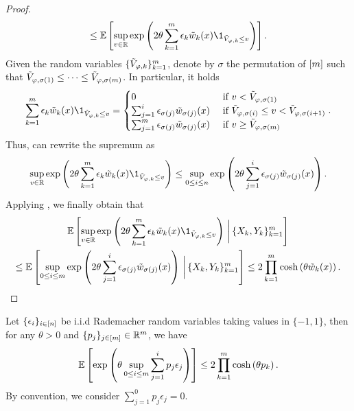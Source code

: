 \begin{proof}
\begin{equation*}
        \le \E\br{\sup_{v \in \R} \exp\pr{2 \theta \sum_{k=1}^{\ccount} \epsilon_{k} \tilde{w}_{k}(x) \1_{\tilde{V}_{\varphi,k} \le v}}}.
    \end{equation*}
    Given the random variables $\{\tilde{V}_{\varphi,k}\}_{k=1}^{m}$, denote by $\sigma$ the permutation of $[m]$ such that $\tilde{V}_{\varphi,\sigma(1)}\le\cdots\le \tilde{V}_{\varphi,\sigma(m)}$. In particular, it holds
    \begin{equation*}
        \sum_{k=1}^{\ccount} \epsilon_{k} \tilde{w}_{k}(x) \1_{\tilde{V}_{\varphi,k} \le v}
        = 
        \begin{cases}
            0 & \text { if } v < \tilde{V}_{\varphi,\sigma(1)} 
            \\ 
            \sum_{j=1}^i  \epsilon_{\sigma(j)} \tilde{w}_{\sigma(j)}(x) & \text { if } \tilde{V}_{\varphi,\sigma(i)} \le v < \tilde{V}_{\varphi,\sigma(i+1)}
            \\ 
            \sum_{j=1}^{\ccount} \epsilon_{\sigma(j)} \tilde{w}_{\sigma(j)}(x) & \text { if } v \ge \tilde{V}_{\varphi,\sigma(\ccount)}
        \end{cases}.
    \end{equation*}
    Thus, can rewrite the supremum as
    \begin{equation*}
        \sup_{v \in \R} \exp\pr{2 \theta \sum_{k=1}^{\ccount} \epsilon_{k} \tilde{w}_{k}(x) \1_{\tilde{V}_{\varphi,k} \le v}}
        \le \sup_{0 \le i \le n} \exp \pr{2 \theta \sum_{j=1}^i \epsilon_{\sigma(j)} \tilde{w}_{\sigma(j)}(x)}.
    \end{equation*}
    Applying , we finally obtain that
    \begin{multline*}
        \E\br{\sup_{v \in \R} \exp\pr{2 \theta \sum_{k=1}^{\ccount} \epsilon_{k} \tilde{w}_{k}(x) \1_{\tilde{V}_{\varphi,k} \le v}} \,\bigg\vert\, \acn{X_{k}, Y_{k}}_{k=1}^{\ccount}} 
        \\
        \le \E\br{\sup_{0 \le i \le \ccount} \exp \pr{2 \theta \sum_{j=1}^i \epsilon_{\sigma(j)} \tilde{w}_{\sigma(j)}(x)} \,\bigg\vert\, \acn{X_{k}, Y_{k}}_{k=1}^{\ccount}}
        \le 2 \prod_{k=1}^{\ccount} \cosh\pr{\theta \tilde{w}_{k}(x)}.
    \end{multline*}
  \end{proof}

  \begin{lemma}\label{lem:bound:weighted-rademacher}
    Let $\{{\epsilon_{i}}\}_{i\in[n]}$ be i.i.d Rademacher random variables taking values in $\{-1,1\}$, then for any $\theta>0$ and $\{p_{j}\}_{j\in[m]}\in\mathbb{R}^{m}$, we have
    \[
        \mathbb{E}\left[{\exp \left({\theta \sup_{0\le i \le m} \sum_{j=1}^i p_{j} \epsilon_{j}}\right)}\right] \le 2 \prod_{k=1}^{m} \cosh\left({\theta p_{k}}\right).
    \]
    By convention, we consider $\sum_{j=1}^0 p_{j} \epsilon_{j}=0$.
  \end{lemma}

